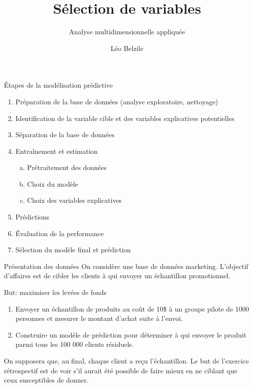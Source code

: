 \documentclass[
  ignorenonframetext,
]{beamer}
\title{Sélection de variables}
\subtitle{Analyse multidimensionnelle appliquée}
\author{Léo Belzile}
\date{}
\institute{HEC Montréal}
\providecommand{\tightlist}{%
  \setlength{\itemsep}{0pt}\setlength{\parskip}{0pt}}\usepackage{longtable,booktabs,array}
\begin{document}
\frame{\titlepage}


\begin{frame}{Étapes de la modélisation prédictive}
\label{uxe9tapes-de-la-moduxe9lisation-pruxe9dictive}
\begin{enumerate}
\tightlist
\item
  Préparation de la base de données (analyse exploratoire, nettoyage)
\item
  Identification de la variable cible et des variables explicatives
  potentielles
\item
  Séparation de la base de données
\item
  Entraînement et estimation

  \begin{enumerate}
  [a.]
  \tightlist
  \item
    Prétraitement des données
  \item
    Choix du modèle
  \item
    Choix des variables explicatives
  \end{enumerate}
\item
  Prédictions
\item
  Évaluation de la performance
\item
  Sélection du modèle final et prédiction
\end{enumerate}
\end{frame}

\begin{frame}{Présentation des données}
\label{pruxe9sentation-des-donnuxe9es}
On considère une base de données marketing. L'objectif d'affaires est de
cibler les clients à qui envoyer un échantillon promotionnel.

But: maximiser les levées de fonds

\begin{enumerate}
\tightlist
\item
  Envoyer un échantillon de produits au coût de 10\$ à un groupe pilote
  de 1000 personnes et mesurer le montant d'achat suite à l'envoi.
\item
  Construire un modèle de prédiction pour déterminer à qui envoyer le
  produit parmi tous les 100 000 clients résiduels.
\end{enumerate}

On supposera que, au final, chaque client a reçu l'échantillon. Le but
de l'exercice rétrospectif est de voir s'il aurait été possible de faire
mieux en ne ciblant que ceux susceptibles de donner.
\end{frame}
\end{document}
